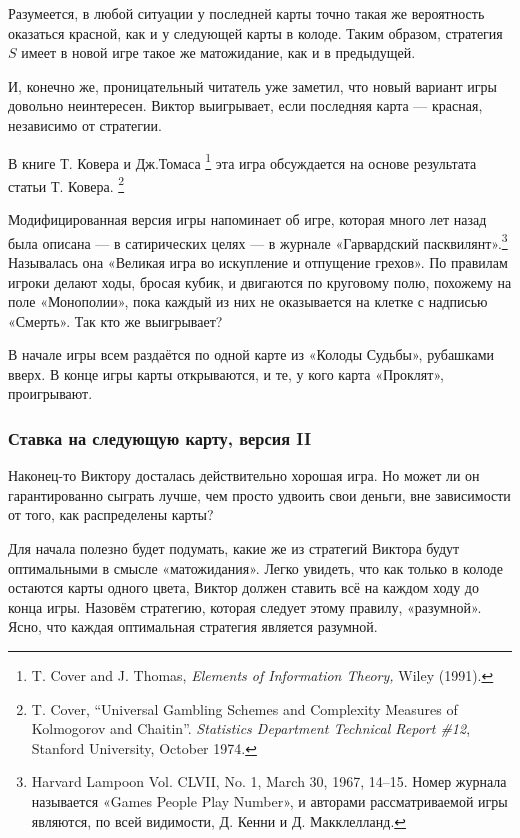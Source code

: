 Разумеется, в любой ситуации у последней карты точно такая же вероятность оказаться красной, как и у следующей карты в колоде.
Таким образом, стратегия $S$ имеет в новой игре такое же матожидание, как и в предыдущей.

И, конечно же, проницательный читатель уже заметил, что новый вариант игры довольно неинтересен.
Виктор выигрывает, если последняя карта --- красная, независимо от стратегии.
\heart

В книге Т. Ковера и Дж.Томаса%
\footnote{T. Cover and J. Thomas, \emph{Elements of Information Theory,} Wiley (1991).} 
эта игра обсуждается на основе результата статьи Т. Ковера.%
\footnote{T. Cover, ``Universal Gambling Schemes and Complexity Measures of Kolmogorov and Chaitin''. \emph{Statistics Department Technical Report \#12}, Stanford University, October 1974.}

Модифицированная версия игры %
напоминает об игре, которая много лет назад была описана --- в сатирических целях --- в журнале «Гарвардский пасквилянт».\footnote{Harvard Lampoon Vol. CLVII, No. 1, March 30, 1967, 14--15.
Номер журнала называется «Games People Play Number», и авторами рассматриваемой игры являются, по всей видимости, Д. Кенни и Д. Макклелланд.%
}
Называлась она «Великая игра во искупление и отпущение грехов».
По правилам игроки делают ходы, бросая кубик, и двигаются по круговому полю, похожему на поле «Монополии», пока каждый из них не оказывается на клетке с надписью «Смерть».
Так кто же выигрывает?

В начале игры всем раздаётся по одной карте из «Колоды Судьбы», рубашками вверх.
В конце игры карты открываются, и те, у кого карта «Проклят», проигрывают.

\subsubsection*{Ставка на следующую карту, версия II}%

Наконец-то Виктору досталась действительно хорошая игра.
Но может ли он гарантированно сыграть лучше, чем просто удвоить свои деньги, вне зависимости от того, как распределены карты?

\medskip

Для начала полезно будет подумать, какие же из стратегий Виктора будут оптимальными в смысле «матожидания».
Легко увидеть, что как только в колоде остаются карты одного цвета, Виктор должен ставить всё на каждом ходу до конца игры.
Назовём стратегию, которая следует этому правилу, «разумной».
Ясно, что каждая оптимальная стратегия является разумной.

